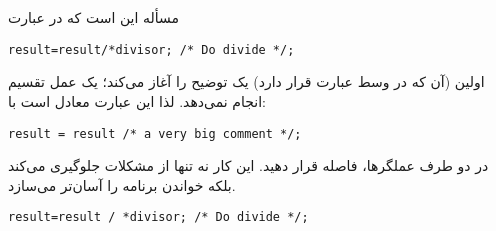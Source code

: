 \section{}
\paragraph{}\label{answer:91}
مسأله این است که در عبارت
\begin{LTR}
    \begin{lstlisting}[style=C++Style]
        result=result/*divisor; /* Do divide */;
    \end{lstlisting}
\end{LTR}

اولین \lr{\texttt{/*}} (آن که در وسط عبارت قرار دارد) یک توضیح را آغاز می‌کند؛ یک عمل تقسیم انجام نمی‌دهد. لذا این عبارت معادل است با:
\begin{LTR}
    \begin{lstlisting}[style=C++Style]
        result = result /* a very big comment */;
    \end{lstlisting}
\end{LTR}

در دو طرف عملگرها، فاصله قرار دهید. این کار نه تنها از مشکلات جلوگیری می‌کند بلکه خواندن برنامه را آسان‌تر می‌سازد.
\begin{LTR}
    \begin{lstlisting}[style=C++Style]
        result=result / *divisor; /* Do divide */;
    \end{lstlisting}
\end{LTR}
